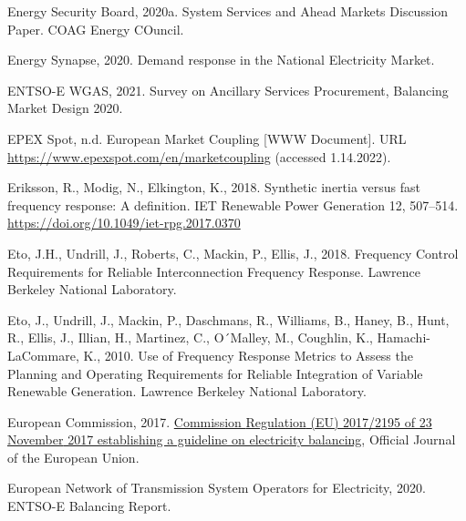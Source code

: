 \documentclass[12pt,a4paper,]{report}
\newlength{\cslhangindent}
\newenvironment{CSLReferences}[2] %
 {%
  \setlength{\parindent}{0pt}
  \ifodd #1 \everypar{\setlength{\hangindent}{\cslhangindent}}\ignorespaces\fi
  \ifnum #2 > 0
  \setlength{\parskip}{#2\baselineskip}
  \fi
 }%
 {}
\begin{document}
\begin{CSLReferences}{1}{0}
\leavevmode{}%
Energy Security Board, 2020a. System {Services} and {Ahead Markets
Discussion Paper}. COAG Energy COuncil.

\leavevmode{}%
Energy Synapse, 2020. Demand response in the {National Electricity
Market}.

\leavevmode{}%
ENTSO-E WGAS, 2021. Survey on {Ancillary Services Procurement},
{Balancing Market Design} 2020.

\leavevmode{}%
EPEX Spot, n.d. European {Market Coupling} {[}WWW Document{]}. URL
\url{https://www.epexspot.com/en/marketcoupling} (accessed 1.14.2022).

\leavevmode{}%
Eriksson, R., Modig, N., Elkington, K., 2018. Synthetic inertia versus
fast frequency response: {A} definition. IET Renewable Power Generation
12, 507--514. \url{https://doi.org/10.1049/iet-rpg.2017.0370}

\leavevmode{}%
Eto, J.H., Undrill, J., Roberts, C., Mackin, P., Ellis, J., 2018.
Frequency {Control Requirements} for {Reliable Interconnection Frequency
Response}. Lawrence Berkeley National Laboratory.

\leavevmode{}%
Eto, J., Undrill, J., Mackin, P., Daschmans, R., Williams, B., Haney,
B., Hunt, R., Ellis, J., Illian, H., Martinez, C., O´Malley, M.,
Coughlin, K., Hamachi-LaCommare, K., 2010. Use of {Frequency Response
Metrics} to {Assess} the {Planning} and {Operating Requirements} for
{Reliable Integration} of {Variable Renewable Generation}. Lawrence
Berkeley National Laboratory.

\leavevmode{}%
European Commission, 2017.
\href{https://eur-lex.europa.eu/legal-content/EN/TXT/?uri=uriserv:OJ.L_.2017.312.01.0006.01.ENG&toc=OJ:L:2017:312:TOC\#d1e4442-6-1}{Commission
{Regulation} ({EU}) 2017/2195 of 23 {November} 2017 establishing a
guideline on electricity balancing}, Official Journal of the European
Union.

\leavevmode{}%
European Network of Transmission System Operators for Electricity, 2020.
{ENTSO-E Balancing Report}.


\end{CSLReferences}
\end{document}
